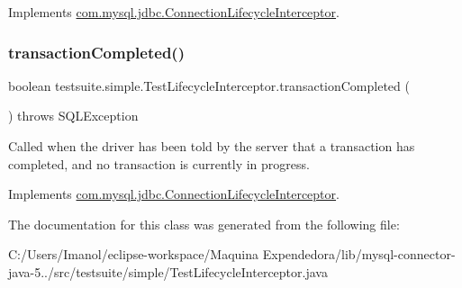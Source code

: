 Implements \mbox{\hyperlink{interfacecom_1_1mysql_1_1jdbc_1_1_connection_lifecycle_interceptor_accfde1498fb7224e65b1557ff9efe873}{com.\+mysql.\+jdbc.\+Connection\+Lifecycle\+Interceptor}}.

\mbox{\label{classtestsuite_1_1simple_1_1_test_lifecycle_interceptor_a00973c1a52ebc81176be2b9a46f5aa66}} 
\subsubsection{\texorpdfstring{transaction\+Completed()}{transactionCompleted()}}
{\footnotesize\ttfamily boolean testsuite.\+simple.\+Test\+Lifecycle\+Interceptor.\+transaction\+Completed (\begin{DoxyParamCaption}{ }\end{DoxyParamCaption}) throws S\+Q\+L\+Exception}

Called when the driver has been told by the server that a transaction has completed, and no transaction is currently in progress. 

Implements \mbox{\hyperlink{interfacecom_1_1mysql_1_1jdbc_1_1_connection_lifecycle_interceptor_a439077fdf5cb12487a9689838a1983e6}{com.\+mysql.\+jdbc.\+Connection\+Lifecycle\+Interceptor}}.



The documentation for this class was generated from the following file\+:\begin{DoxyCompactItemize}
\item 
C\+:/\+Users/\+Imanol/eclipse-\/workspace/\+Maquina Expendedora/lib/mysql-\/connector-\/java-\/5../src/testsuite/simple/Test\+Lifecycle\+Interceptor.\+java\end{DoxyCompactItemize}
